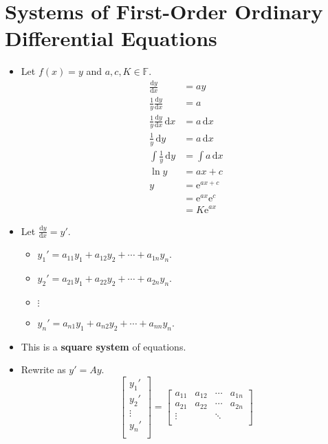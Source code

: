\documentclass{article}
\newcommand{\dy}{\text{d}y}
\newcommand{\dx}{\text{d}x}
\newcommand{\dd}[2][]{\frac{\text{d}#1}{\text{d}#2}}
\newcommand{\e}{\text{e}}
\begin{document}
\section*{Systems of First-Order Ordinary Differential Equations}
\begin{itemize}
    \item {}Let $f(x)=y$ and $a,c,K\in\mathbb{F}$.
    \begin{align*}
        \dd[y]{x} &= ay\\
        \frac{1}{y}\dd[y]{x} &= a\\
        \frac{1}{y}\dd[y]{x}\, \dx &= a\, \dx\\
        \frac{1}{y}\, \dy &= a\, \dx\\
        \int \frac{1}{y}\, \dy &= \int a\, \dx\\
        \ln y &= ax+c\\
        y &= \e^{ax+c}\\
        &= \e^{ax}\text{e}^c\\
        &= K\e^{ax}
    \end{align*}
    \item Let $\dd[y]{x}=y'$.
    \begin{itemize}
        \item $y_1' = a_{11}y_1+a_{12}y_2+\cdots+a_{1n}y_n$.
        \item $y_2' = a_{21}y_1+a_{22}y_2+\cdots+a_{2n}y_n$.
        \item $\vdots$
        \item $y_n' = a_{n1}y_1+a_{n2}y_2+\cdots+a_{nn}y_n$.
    \end{itemize}
    \item This is a \textbf{square system} of equations.
    \item Rewrite as $y' = Ay$.
    \begin{equation*}
        \begin{bmatrix}
            y_1'\\
            y_2'\\
            \vdots\\
            y_n'\\
        \end{bmatrix}
        =
        \begin{bmatrix}
            a_{11} & a_{12} & \cdots & a_{1n}\\
            a_{21} & a_{22} & \cdots & a_{2n}\\
            \vdots &        & \ddots &       \\

\end{bmatrix}
\end{equation*}
\end{itemize}
\end{document}
